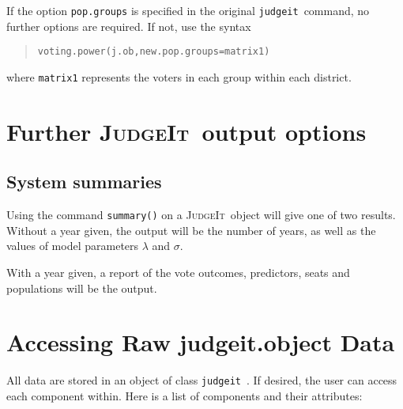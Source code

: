 \documentclass[oneside,letterpaper,titlepage]{article}
\newcommand{\JudgeIt}{\textsc{JudgeIt}\ }
\newcommand{\jud}{\texttt{judgeit}\ }
\begin{document}
If the option \texttt{pop.groups} is specified in the original \jud command, no further options are required. If not, use the syntax

\begin{quote} \texttt{voting.power(j.ob,new.pop.groups=matrix1)} \end{quote}

where \texttt{matrix1} represents the voters in each group within each district.

\section{Further \JudgeIt output options}

\subsection*{System summaries}

Using the command \texttt{summary()} on a \JudgeIt object will give one
of two results. Without a year given, the output will be the number of
years, as well as the values of model parameters $\lambda$ and
$\sigma$.

With a year given, a report of the vote outcomes, predictors, seats
and populations will be the output.

\section{Accessing Raw judgeit.object Data}

All data are stored in an object of class \jud. If desired,
the user can access each component within. Here is a list of
components and their attributes:
\end{document}
